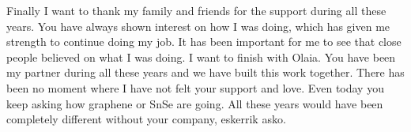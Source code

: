 Finally I want to thank my family and friends for the support during all these years. You have always shown interest 
on how I was doing, which has given me strength to continue doing my job. It has been important for me to see that 
close people believed on what I was doing. I want to finish with Olaia. You have been my partner during all these 
years and we have built this work together. There has been no moment where I have not felt your support and love. 
Even today you keep asking how graphene or SnSe are going. All these years would have been completely different 
without your company, eskerrik asko. 
